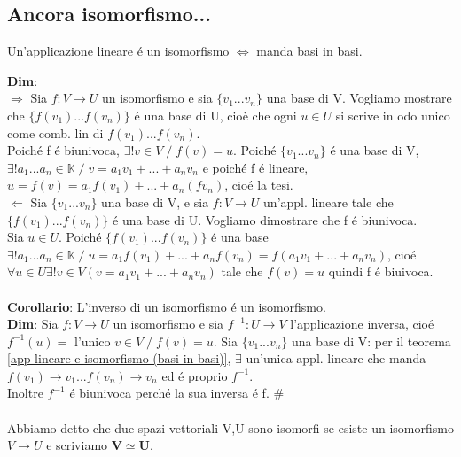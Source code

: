 \documentclass[12pt]{article}
\begin{document}
\subsection{Ancora isomorfismo...}


\begin{theorem}
    
Un'applicazione lineare é un isomorfismo $\iff$ manda basi in basi.
\label{app lineare e isomorfismo (basi in basi)}
\end{theorem}

\noindent\textbf{Dim}:\\
$\Rightarrow$ Sia $f:V\longrightarrow U$ un isomorfismo e sia $\{v_1...v_n\}$ una base di V. Vogliamo mostrare che $\{f(v_1)...f(v_n)\}$ é una base di U, cioè che ogni $u\in U$ si scrive in odo unico come comb. lin di $f(v_1)...f(v_n)$. \\Poiché f é biunivoca, $\exists! v\in V \;/\; f(v) = u$. Poiché $\{v_1...v_n\}$ é una base di V, $\exists! a_1...a_n \in \mathbb{K} \;/\; v=a_1v_1+...+a_nv_n$ e poiché f é lineare, $u = f(v) = a_1f(v_1) + ...+ a_n(fv_n)$, cioé la tesi.\\
$\Leftarrow$ Sia $\{v_1...v_n\}$ una base di V, e sia $f:V\longrightarrow U$ un'appl. lineare tale che $\{f(v_1)...f(v_n)\}$ é una base di U. Vogliamo dimostrare che f é biunivoca.\\
Sia $u\in U $. Poiché $\{f(v_1)...f(v_n)\}$ é una base $\exists! a_1...a_n \in \mathbb{K} \;/\; u = a_1f(v_1)+...+a_nf(v_n) = f(a_1v_1+...+a_nv_n)$, cioé $\forall u \in U \exists! v\in V (v = a_1v_1+...+a_nv_n)$ tale che $f(v) = u$ quindi f é biuivoca.\\\\
\textbf{Corollario}: L'inverso di un isomorfismo é un isomorfismo.\\
\textbf{Dim}: Sia $f:V\longrightarrow U$ un isomorfismo e sia $f^{-1}: U\longrightarrow V$ l'applicazione inversa, cioé $f^{-1}(u)=$ l'unico $v\in V \;/\; f(v) = u$. Sia $\{v_1...v_n\}$ una base di V: per il teorema \ref{app lineare e isomorfismo (basi in basi)}, $\exists$ un'unica appl. lineare che manda $f(v_1) \rightarrow v_1... f(v_n)\rightarrow v_n$ ed é proprio $f^{-1}$.\\
Inoltre $f^{-1}$ é biunivoca perché la sua inversa é f. $\#$\\\\
Abbiamo detto che due spazi vettoriali V,U sono isomorfi se esiste un isomorfismo $V\rightarrow U$ e scriviamo $\boldsymbol{V \simeq U}$.\\\\
\end{document}
